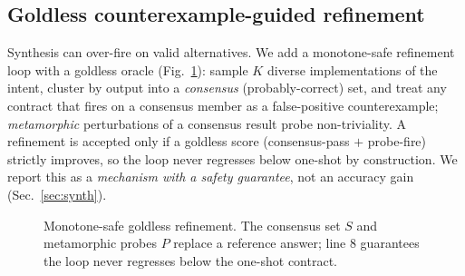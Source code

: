 \documentclass[10pt,twocolumn,letterpaper]{article}
\begin{document}
\subsection{Goldless counterexample-guided refinement}
Synthesis can over-fire on valid alternatives. We add a monotone-safe refinement
loop with a goldless oracle (Fig.~\ref{alg:cegis}): sample $K$ diverse
implementations of the intent, cluster by output into a \emph{consensus}
(probably-correct) set, and treat any contract that fires on a consensus member
as a false-positive counterexample; \emph{metamorphic} perturbations of a
consensus result probe non-triviality. A refinement is accepted only if a
goldless score (consensus-pass $+$ probe-fire) strictly improves, so the loop
never regresses below one-shot by construction. We report this as a
\emph{mechanism with a safety guarantee}, not an accuracy gain
(Sec.~\ref{sec:synth}).

\begin{figure}[t]\centering
{}
\caption{Monotone-safe goldless refinement. The consensus set $S$ and
metamorphic probes $P$ replace a reference answer; line 8 guarantees the loop
never regresses below the one-shot contract.}
\label{alg:cegis}
\end{figure}
\end{document}
